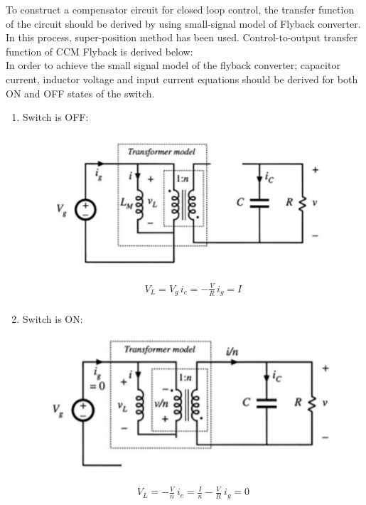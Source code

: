 \documentclass{article}
\begin{document}
To construct a compensator circuit for closed loop control, the transfer function of the circuit should be derived by using small-signal model of Flyback converter. In this process, super-position method has been used. Control-to-output transfer function of CCM Flyback is derived below:\\


In order to achieve the small signal model of the flyback converter; capacitor current, inductor voltage and input current equations should be derived for both ON and OFF states of the switch.

\begin{enumerate}
    \item Switch is OFF:
    \begin{figure}[H]
        \centering
        \includegraphics{SOFF.png}
        \label{fig:my_label}
    \end{figure}
    \begin{gather*}
        V_L=V_g\, i_c=-\frac{V}{R}\,i_g=I\\
    \end{gather*}
    
     \item Switch is ON:
    \begin{figure}[H]
        \centering
        \includegraphics{SON.png}
        \label{fig:my_label}
    \end{figure}
    \begin{gather*}
        V_L=-\frac{V}{n}\: i_c=\frac{I}{n}-\frac{V}{R}\:i_g=0
    \end{gather*}
    

\end{enumerate}
\end{document}
